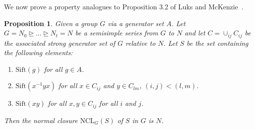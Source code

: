 \documentclass[11pt]{madras}%
\newtheorem{proposition}[theorem]{Proposition}
\theoremstyle{remark}
\newcommand{\NCL}[2][]{\ensuremath{\mathrm{NCL}_{#1}({#2})}}
\newcommand{\Sift}[1]{{\ensuremath{\mathrm{Sift}({#1})}}}
\begin{document}
We now prove a property analogues to Proposition 3.2 of Luks and
McKenzie~\cite{luks88solvable}.

\begin{proposition}\label{prop-sift}
  Given a group $G$ via a generator set $A$.  Let $G = N_0 \unrhd
  \ldots \unrhd N_t = N$ be a semisimple series from $G$ to $N$ and
  let $C = \cup_{ij}C_{ij}$ be the associated strong generator set of
  $G$ relative to $N$.  Let $S$ be the set containing the following
  elements:
\begin{enumerate}
  \item $\Sift{g}$ for all $g \in A$.
  \item \label{pro-commutator}$\Sift{x^{-1}yx}$ for all $x \in
    C_{ij}$ and $y \in C_{lm}$, $(i,j) < (l,m)$.
  \item \label{pro-product} $\Sift{xy}$ for all $x,y \in C_{ij}$ for
    all $i$ and $j$.
\end{enumerate}
Then the normal closure $\NCL[G]{S}$ of $S$ in $G$ is $N$.
\end{proposition}
\end{document}
